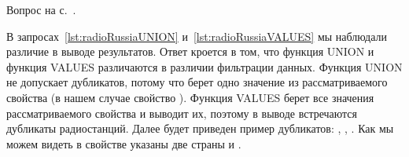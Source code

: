 \begin{task}
    \label{answer:radio_stations2}

    \AnswerBackref Вопрос на с.~\pageref{question:radio2}.

В запросах~\ref{lst:radioRussiaUNION} и~\ref{lst:radioRussiaVALUES} мы наблюдали различие в выводе результатов. Ответ кроется в том, что функция UNION и функция VALUES различаются в различии фильтрации данных. Функция UNION не допускает дубликатов, потому что берет одно значение из рассматриваемого свойства (в нашем случае свойство ). Функция VALUES берет все значения рассматриваемого свойства и выводит их, поэтому в выводе встречаются дубликаты радиостанций. Далее будет приведен пример дубликатов: , , . Как мы можем видеть в свойстве  указаны две страны  и .

\end{task}
